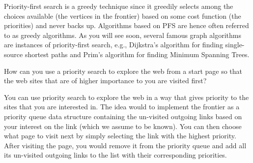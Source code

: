 Priority-first search is a greedy technique since it greedily selects
among the choices available (the vertices in the frontier) based on
some cost function (the priorities) and never backs up.  Algorithms
based on PFS are hence often referred to as greedy algorithms.  As you
will see soon, several famous graph algorithms are instances of
priority-first search, e.g., Dijkstra's algorithm for finding
single-source shortest paths and Prim's algorithm for finding Minimum
Spanning Trees.


\begin{simpleexample}
How can you use a priority search to explore the web from a start page
so that the web sites that are of higher importance to you are visited
first?


You can use priority search to explore the web in a way that gives
priority to the sites that you are interested in. The idea would to
implement the frontier as a priority queue data structure containing
the un-visited outgoing links based on your interest on the link (which
we assume to be known). You can then choose what page to visit next by
simply selecting the link with the highest priority. After visiting
the page, you would remove it from the priority queue and add all its
un-visited outgoing links to the list with their corresponding priorities.
\end{simpleexample}

\begin{comment}
\subsection{SML Code} 

Here we give the SML code for the generic version of \dfs{} along with the implementation of directed cycle detection and topological sort.

\begin{small}



\end{small}

\newpage
\begin{figure}
\centering
\texttt{[image: graph-search/bear]}
\caption{Don't forget to have fun.}
\label{fig:dfs::bear}
\end{figure}

\end{comment}

\flushchapter




\flushchapter
